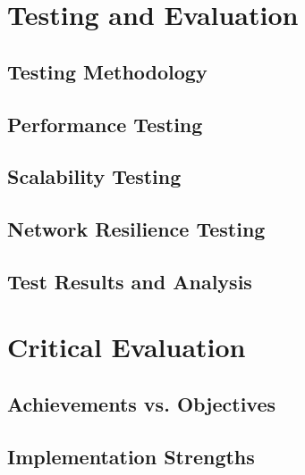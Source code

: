 \documentclass[12pt,a4paper]{report}
\begin{document}
\chapter{Testing and Evaluation}
\section{Testing Methodology}

\section{Performance Testing}

\section{Scalability Testing}

\section{Network Resilience Testing}

\section{Test Results and Analysis}

\chapter{Critical Evaluation}
\section{Achievements vs. Objectives}

\section{Implementation Strengths}
\end{document}
